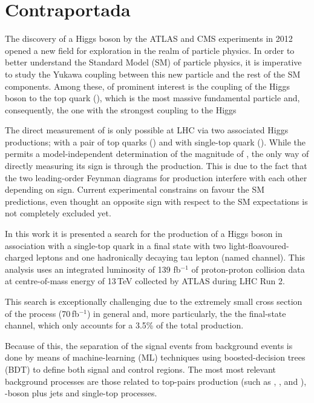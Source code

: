 
\chapter*{Contraportada}


The discovery of a Higgs boson by the ATLAS and CMS experiments in 2012 
opened a new field for exploration in the realm of particle physics.
In order to better understand the Standard Model (SM) of particle physics, 
it is imperative to study the Yukawa coupling between this new particle and
the rest of the SM components. 
Among these, of prominent interest is the coupling of the Higgs boson to the top 
quark (\yt), which is the most massive fundamental particle and, consequently, the one 
with the strongest coupling to the Higgs

The direct measurement of \yt is only possible at LHC via two associated Higgs 
productions; with a pair of top quarks (\ttH) and with single-top quark (\tHq).
While the \ttH permits a model-independent determination of the magnitude of \yt, 
the only way of directly measuring its sign is through the \tHq production. This is due 
to the fact that the two leading-order Feynman diagrams for \tHq production interfere 
with each other depending on \yt sign. 
Current experimental constrains on \yt favour the SM predictions, even thought an 
opposite sign with respect to the SM expectations is not completely excluded yet.

In this work it is presented a search for the production of a Higgs boson in association 
with a single-top quark in a final state with two light-floavoured-charged leptons and one 
hadronically decaying tau lepton (named \dileptau channel). This analysis uses an integrated 
luminosity of 139 fb$^{-1}$ of proton-proton collision data at centre-of-mass energy of 
13$\,$TeV collected by ATLAS during LHC Run 2. 


This search is exceptionally challenging due to the extremely small cross section of 
the \tHq process (70$\,$fb$^{-1}$) in general and, more particularly, the the \dileptau
final-state channel, which only accounts for a 3.5\% of the total \tHq production.

Because of this, the separation of the \tHq signal events from background events is 
done by means of machine-learning (ML) techniques using boosted-decision trees 
(BDT) to define both signal and control regions. The most most relevant background 
processes are those related to top-pairs production (such as \ttbar, \ttH, \ttZ and 
\ttW), \PZ-boson plus jets and single-top processes.


